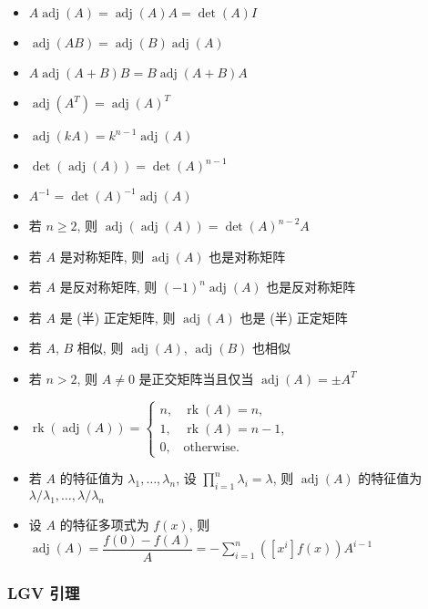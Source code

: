 \begin{itemize}
    \item \(A\operatorname{adj}(A)=\operatorname{adj}(A)A=\operatorname{det}(A)I\)
    \item \(\operatorname{adj}(AB)=\operatorname{adj}(B)\operatorname{adj}(A)\)
    \item \(A\operatorname{adj}(A+B)B=B\operatorname{adj}(A+B)A\)
    \item \(\operatorname{adj}(A^T)=\operatorname{adj}(A)^T\)
    \item \(\operatorname{adj}(kA)=k^{n-1}\operatorname{adj}(A)\)
    \item \(\operatorname{det}(\operatorname{adj}(A))=\operatorname{det}(A)^{n-1}\)
    \item \(A^{-1}=\operatorname{det}(A)^{-1}\operatorname{adj}(A)\)
    \item 若 \(n\geq 2\), 则 \(\operatorname{adj}(\operatorname{adj}(A))=\operatorname{det}(A)^{n-2}A\)
    \item 若 \(A\) 是对称矩阵, 则 \(\operatorname{adj}(A)\) 也是对称矩阵
    \item 若 \(A\) 是反对称矩阵, 则 \((-1)^n\operatorname{adj}(A)\) 也是反对称矩阵
    \item 若 \(A\) 是 (半) 正定矩阵, 则 \(\operatorname{adj}(A)\) 也是 (半) 正定矩阵
    \item 若 \(A\), \(B\) 相似, 则 \(\operatorname{adj}(A)\), \(\operatorname{adj}(B)\) 也相似
    \item 若 \(n>2\), 则 \(A\neq 0\) 是正交矩阵当且仅当 \(\operatorname{adj}(A)=\pm A^T\)
    \item \(\operatorname{rk}(\operatorname{adj}(A))=\begin{cases}
              n, & \operatorname{rk}(A)=n,   \\
              1, & \operatorname{rk}(A)=n-1, \\
              0, & \text{otherwise}.
          \end{cases}\)
    \item 若 \(A\) 的特征值为 \(\lambda_1,\dots,\lambda_n\), 设 \(\prod_{i=1}^n\lambda_i=\lambda\), 则 \(\operatorname{adj}(A)\) 的特征值为 \(\lambda/\lambda_1,\dots,\lambda/\lambda_n\)
    \item 设 \(A\) 的特征多项式为 \(f(x)\), 则 \(\operatorname{adj}(A)=\dfrac{f(0)-f(A)}{A}=-\sum_{i=1}^n\left(\left[x^i\right]f(x)\right)A^{i-1}\)
\end{itemize}

\subsubsection{LGV 引理}

